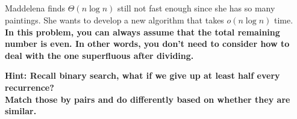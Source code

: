 \begin{parts}
\part{} 
Maddelena finds $\Theta(n\log n)$ still not fast enough since she has so many paintings. She wants to develop a new algorithm that takes $o(n\log n)$ time.  \\
\textbf{In this problem, you can always assume that the total remaining number is even. In other words, you don't need to consider how to deal with the one superfluous after dividing.}

\textbf{Hint: Recall binary search, what if we give up at least half every recurrence? \\ Match those by pairs and do differently based on whether they are similar.}

\begin{subparts}
    \begin{solution}
    \\
    \\
    \\
    \\
    \\
    \\
    \\
    \\
    \end{solution}
    \begin{solution}
    \\
    \\
    \\
    \\
    \\
    \\
    \\
    \\ 
    \\
    \\
    \\
    \\
    \\
    \end{solution}
    \begin{solution}
    \\
    \\
    \end{solution}
\end{subparts}

\end{parts}